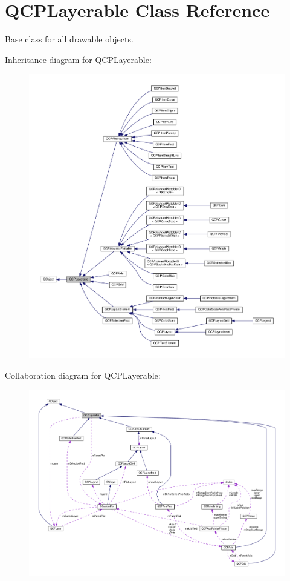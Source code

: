 \hypertarget{classQCPLayerable}{}\section{Q\+C\+P\+Layerable Class Reference}
\label{classQCPLayerable}


Base class for all drawable objects.  




Inheritance diagram for Q\+C\+P\+Layerable\+:
\nopagebreak
\begin{figure}[H]
\begin{center}
\leavevmode
\includegraphics[width=350pt]{classQCPLayerable__inherit__graph}
\end{center}
\end{figure}


Collaboration diagram for Q\+C\+P\+Layerable\+:
\nopagebreak
\begin{figure}[H]
\begin{center}
\leavevmode
\includegraphics[width=350pt]{classQCPLayerable__coll__graph}
\end{center}
\end{figure}
